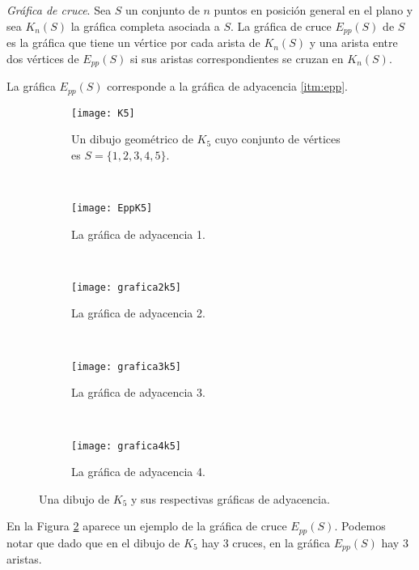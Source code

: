 \begin{definition}{\emph{Gráfica de cruce}.}
  Sea $S$ un conjunto de $n$ puntos en posición general en el plano y sea
  $K_n(S)$ la gráfica completa  asociada a $S$. La gráfica de cruce $E_{pp}(S)$
  de $S$ es la gráfica que tiene un vértice por cada arista de $K_n(S)$ y una
  arista entre dos vértices de $E_{pp}(S)$ si sus aristas correspondientes se
  cruzan en $K_n(S)$.
\end{definition}

La gráfica $E_{pp}(S)$ corresponde a la gráfica de adyacencia \ref{itm:epp}.
\begin{figure}
\begin{subfigure}{.5\textwidth}
  \centering
  \texttt{[image: K5]}
  \caption{Un dibujo geométrico de $K_5$ cuyo conjunto de vértices es $S=\{1,2,3,4,5\}$.}
  \label{fig:k5}
\end{subfigure}%
~
\begin{subfigure}{.5\textwidth}
  \centering
  \texttt{[image: EppK5]}
  \caption{La gráfica de adyacencia 1.}
  \label{fig:eppk5}
\end{subfigure}
~
\begin{subfigure}{.5\textwidth}
  \centering
  \texttt{[image: grafica2k5]}
  \caption{La gráfica de adyacencia 2.}
  \label{fig:2k5}
\end{subfigure}
~
\begin{subfigure}{.5\textwidth}
  \centering
  \texttt{[image: grafica3k5]}
  \caption{La gráfica de adyacencia 3.}
  \label{fig:3k5}
\end{subfigure}
~
\begin{subfigure}{.5\textwidth}
  \centering
  \texttt{[image: grafica4k5]}
  \caption{La gráfica de adyacencia 4.}
  \label{fig:4k5}
\end{subfigure}
\caption{Una dibujo de $K_5$ y sus respectivas gráficas de adyacencia.}
\label{fig:ejemploeppk5}
\end{figure}

En la Figura \ref{fig:eppk5} aparece un ejemplo de la gráfica de cruce
$E_{pp}(S)$. Podemos notar que dado que en el dibujo de $K_5$ hay 3 cruces, en
la gráfica $E_{pp}(S)$ hay 3 aristas.

